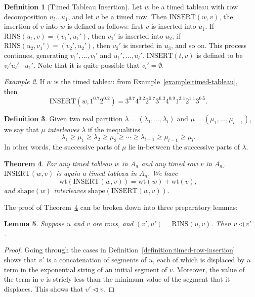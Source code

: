 \documentclass[10pt]{amsproc}
\newtheorem{theorem}{Theorem}[subsection]
\newtheorem{lemma}[theorem]{Lemma}
\theoremstyle{definition}
\newtheorem{definition}[theorem]{Definition}
\theoremstyle{remark}
\newtheorem{example}[theorem]{Example}
\newcommand{\rowins}{\mathrm{RINS}}
\newcommand{\ins}{\mathrm{INSERT}}
\newcommand{\wt}{\mathrm{wt}}
\newcommand{\shape}{\mathrm{shape}}
\begin{document}
\begin{definition}
  [Timed Tableau Insertion]
  Let $w$ be a timed tableau with row decomposition $u_l\dotsc u_1$, and let $v$ be a timed row.
  Then $\ins(w, v)$, the insertion of $v$ into $w$ is defined as follows:
  first $v$ is inserted into $u_1$.
  If $\rowins(u_1,v)=(v_1',u_1')$, then $v_1'$ is inserted into $u_2$; if $\rowins(u_2,v_1')=(v_2',u_2')$, then $v_2'$ is inserted in $u_3$, and so on.
  This process continues, generating $v_1',\dotsc,v_l'$ and $u_1',\dotsc,u_l'$.
  $\ins(t,v)$ is defined to be $v_l'u_l'\dotsb u_1'$.
  Note that it is quite possible that $v_l'=\emptyset$.
\end{definition}
\begin{example}
  If $w$ is the timed tableau from Example~\ref{example:timed-tableau}, then
  \begin{displaymath}
    \ins(w,1^{0.7}2^{0.2})=3^{0.7}4^{0.2}2^{0.7}3^{0.3}4^{0.9}1^{2.1}2^{1.1}3^{0.5}.
  \end{displaymath}
\end{example}
\begin{definition}
  Given two real partition $\lambda=(\lambda_1,\dotsc,\lambda_l)$ and $\mu=(\mu_1,\dotsc,\mu_{l-1})$, we say that $\mu$ \emph{interleaves} $\lambda$ if the inequalities
  \begin{displaymath}
    \lambda_1 \geq \mu_1 \geq \lambda_2 \geq \mu_2 \geq \dotsb \geq \lambda_{l-1}\geq \mu_{l-1}\geq \mu_l. 
  \end{displaymath}
  In other words, the successive parts of $\mu$ lie in-between the successive parts of $\lambda$.
\end{definition}
\begin{theorem}
  \label{theorem:tableauness-of-insertion}
  For any timed tableau $w$ in $A_n$ and any timed row $v$ in $A_n$, $\ins(w,v)$ is again a timed tableau in $A_n$.
  We have
  \begin{displaymath}
    \wt(\ins(w,v)) = \wt(w) + \wt(v),
  \end{displaymath}
  and $\shape(w)$ interleaves $\shape(\ins(w,v))$.
\end{theorem}
The proof of Theorem~\ref{theorem:tableauness-of-insertion} can be broken down into three preparatory lemmas:
\begin{lemma}
  \label{lemma:dom1.5}
  Suppose $u$ and $v$ are rows, and $(v',u')=\rowins(u,v)$.
  Then $v\lhd v'$.
\end{lemma}
\begin{proof}
  Going through the cases in Definition~\ref{definition:timed-row-insertion} shows that $v'$ is a concatenation of segments of $u$, each of which is displaced by a term in the exponential string of an initial segment of $v$.
  Moreover, the value of the term in $v$ is stricly less than the minimum value of the segment that it displaces.
  This shows that $v'\lhd v$.
\end{proof}
\end{document}
